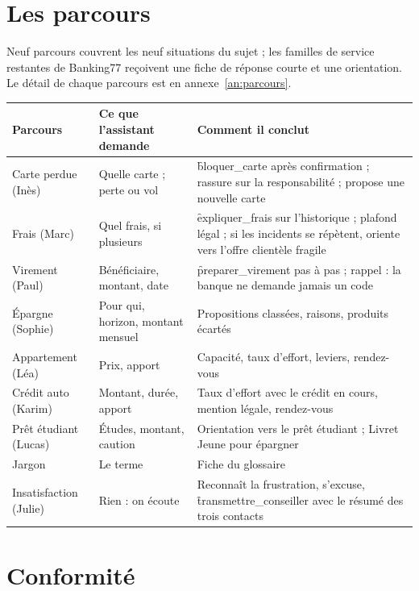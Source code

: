 \section{Les parcours}

Neuf parcours couvrent les neuf situations du sujet ; les familles de service restantes de
Banking77 reçoivent une fiche de réponse courte et une orientation. Le détail de chaque parcours
est en annexe~\ref{an:parcours}.

\begin{center}\small
\begin{tabularx}{\textwidth}{@{}l Y Y@{}}
\toprule
\textbf{Parcours} & \textbf{Ce que l'assistant demande} & \textbf{Comment il conclut} \\
\midrule
Carte perdue (Inès) & Quelle carte ; perte ou vol & \f{bloquer\_carte} après confirmation ; rassure
  sur la responsabilité ; propose une nouvelle carte \\
Frais (Marc) & Quel frais, si plusieurs & \f{expliquer\_frais} sur l'historique ; plafond légal ;
  si les incidents se répètent, oriente vers l'offre clientèle fragile \\
Virement (Paul) & Bénéficiaire, montant, date & \f{preparer\_virement} pas à pas ; rappel :
  la banque ne demande jamais un code \\
Épargne (Sophie) & Pour qui, horizon, montant mensuel & Propositions classées, raisons, produits
  écartés \\
Appartement (Léa) & Prix, apport & Capacité, taux d'effort, leviers, rendez-vous \\
Crédit auto (Karim) & Montant, durée, apport & Taux d'effort avec le crédit en cours, mention
  légale, rendez-vous \\
Prêt étudiant (Lucas) & Études, montant, caution & Orientation vers le prêt étudiant ; Livret Jeune
  pour épargner \\
Jargon & Le terme & Fiche du glossaire \\
Insatisfaction (Julie) & Rien : on écoute & Reconnaît la frustration, s'excuse,
  \f{transmettre\_conseiller} avec le résumé des trois contacts \\
\bottomrule
\end{tabularx}
\end{center}

\section{Conformité}

